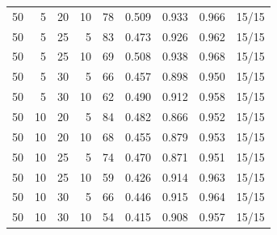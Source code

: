 \begin{tabular}{rrrrrrrrl}
50 & 5 & 20 & 10 & 78 & 0.509 & 0.933 & 0.966 & 15/15 \\
50 & 5 & 25 & 5 & 83 & 0.473 & 0.926 & 0.962 & 15/15 \\
50 & 5 & 25 & 10 & 69 & 0.508 & 0.938 & 0.968 & 15/15 \\
50 & 5 & 30 & 5 & 66 & 0.457 & 0.898 & 0.950 & 15/15 \\
50 & 5 & 30 & 10 & 62 & 0.490 & 0.912 & 0.958 & 15/15 \\
50 & 10 & 20 & 5 & 84 & 0.482 & 0.866 & 0.952 & 15/15 \\
50 & 10 & 20 & 10 & 68 & 0.455 & 0.879 & 0.953 & 15/15 \\
50 & 10 & 25 & 5 & 74 & 0.470 & 0.871 & 0.951 & 15/15 \\
50 & 10 & 25 & 10 & 59 & 0.426 & 0.914 & 0.963 & 15/15 \\
50 & 10 & 30 & 5 & 66 & 0.446 & 0.915 & 0.964 & 15/15 \\
50 & 10 & 30 & 10 & 54 & 0.415 & 0.908 & 0.957 & 15/15 \\
\bottomrule
\end{tabular}
